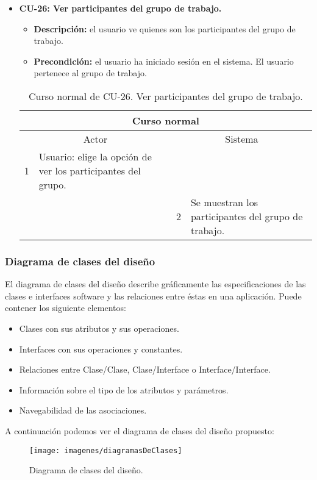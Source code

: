 \begin{itemize}
	\item \textbf{CU-26: Ver participantes del grupo de trabajo.}
	\begin{itemize}
		\item \textbf{Descripción:} el usuario ve quienes son los participantes del grupo de trabajo.
		\item \textbf{Precondición:} el usuario ha iniciado sesión en el sistema. El usuario pertenece al grupo de trabajo.
	\end{itemize}
	\begin{table}[H]
		\centering
		\begin{tabular}{|p{0.3cm}|p{5cm}|p{0.3cm}|p{5cm}|}
			\hline
			\multicolumn{4}{|c|}{Curso normal} \\ \hline
			\multicolumn{2}{|c|}{Actor} & \multicolumn{2}{|c|}{Sistema} \\ \hline
			1 & Usuario: elige la opción de ver los participantes del grupo. &  &  \\ \hline
			&  & 2 & Se muestran los participantes del grupo de trabajo. \\ \hline
		\end{tabular}
		\caption{Curso normal de CU-26. Ver participantes del grupo de trabajo.}
		\label{tabla:cu26-normal}
	\end{table}
\end{itemize}

\subsubsection{Diagrama de clases del diseño}
El diagrama de clases del diseño describe gráficamente las especificaciones de las clases e interfaces software y las relaciones entre éstas en una aplicación. Puede contener los siguiente elementos:
\begin{itemize}
	\item Clases con sus atributos y sus operaciones.
	\item Interfaces con sus operaciones y constantes.
	\item Relaciones entre Clase/Clase, Clase/Interface o Interface/Interface.
	\item Información sobre el tipo de los atributos y parámetros.
	\item Navegabilidad de las asociaciones.
\end{itemize}

A continuación podemos ver el diagrama de clases del diseño propuesto:

\begin{figure}[H]
	\centering
	\texttt{[image: imagenes/diagramasDeClases]}
	\caption{Diagrama de clases del diseño.}
	\label{fig:diagramasDeClases}
\end{figure}

\newpage

